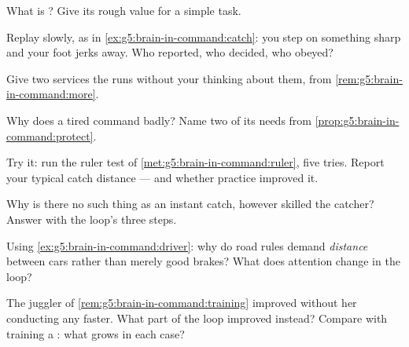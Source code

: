 \begin{exercise}[$\star$]\label{exo:g5:brain-in-command:4}
What is ? Give its rough value for a simple
task.
\end{exercise}

\begin{exercise}[$\star$]\label{exo:g5:brain-in-command:5}
Replay slowly, as in \cref{ex:g5:brain-in-command:catch}:
you step on something sharp and your foot jerks away. Who
reported, who decided, who obeyed?
\end{exercise}

\begin{exercise}[$\star$]\label{exo:g5:brain-in-command:6}
Give two services the  runs without your thinking about
them, from \cref{rem:g5:brain-in-command:more}.
\end{exercise}

\begin{exercise}[$\star$]\label{exo:g5:brain-in-command:7}
Why does a tired  command badly? Name two of its needs
from \cref{prop:g5:brain-in-command:protect}.
\end{exercise}

\begin{exercise}[$\star$]\label{exo:g5:brain-in-command:8}
Try it: run the ruler test of
\cref{met:g5:brain-in-command:ruler}, five tries. Report
your typical catch distance --- and whether practice
improved it.
\end{exercise}

\begin{exercise}[$\star\star$]\label{exo:g5:brain-in-command:9}
Why is there no such thing as an instant catch, however
skilled the catcher? Answer with the loop's three steps.
\end{exercise}

\begin{exercise}[$\star\star$]\label{exo:g5:brain-in-command:10}
Using \cref{ex:g5:brain-in-command:driver}: why do road
rules demand \emph{distance} between cars rather than
merely good brakes? What does attention change in the
loop?
\end{exercise}

\begin{exercise}[$\star\star\star$]\label{exo:g5:brain-in-command:11}
The juggler of \cref{rem:g5:brain-in-command:training}
improved without her  conducting any faster. What
part of the loop improved instead? Compare with training a
: what grows in each case?
\end{exercise}
